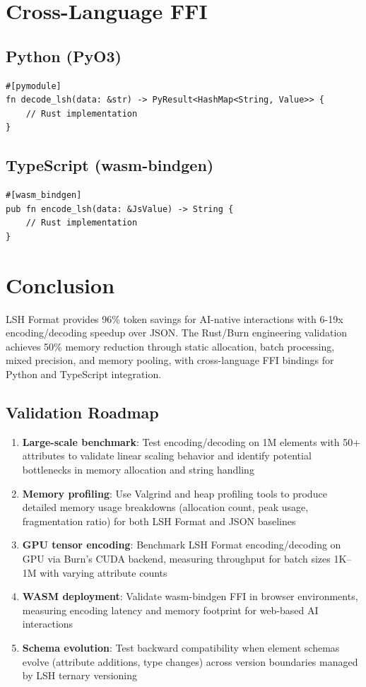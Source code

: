 \documentclass{article}
\begin{document}
\section{Cross-Language FFI}

\subsection{Python (PyO3)}

\begin{verbatim}
#[pymodule]
fn decode_lsh(data: &str) -> PyResult<HashMap<String, Value>> {
    // Rust implementation
}
\end{verbatim}

\subsection{TypeScript (wasm-bindgen)}

\begin{verbatim}
#[wasm_bindgen]
pub fn encode_lsh(data: &JsValue) -> String {
    // Rust implementation
}
\end{verbatim}

\section{Conclusion}

LSH Format provides 96\% token savings for AI-native interactions with 6-19x encoding/decoding speedup over JSON. The Rust/Burn engineering validation achieves 50\% memory reduction through static allocation, batch processing, mixed precision, and memory pooling, with cross-language FFI bindings for Python and TypeScript integration.

\subsection{Validation Roadmap}

\begin{enumerate}
\item \textbf{Large-scale benchmark}: Test encoding/decoding on 1M elements with 50+ attributes to validate linear scaling behavior and identify potential bottlenecks in memory allocation and string handling
\item \textbf{Memory profiling}: Use Valgrind and heap profiling tools to produce detailed memory usage breakdowns (allocation count, peak usage, fragmentation ratio) for both LSH Format and JSON baselines
\item \textbf{GPU tensor encoding}: Benchmark LSH Format encoding/decoding on GPU via Burn's CUDA backend, measuring throughput for batch sizes 1K--1M with varying attribute counts
\item \textbf{WASM deployment}: Validate wasm-bindgen FFI in browser environments, measuring encoding latency and memory footprint for web-based AI interactions
\item \textbf{Schema evolution}: Test backward compatibility when element schemas evolve (attribute additions, type changes) across version boundaries managed by LSH ternary versioning
\end{enumerate}
\end{document}
